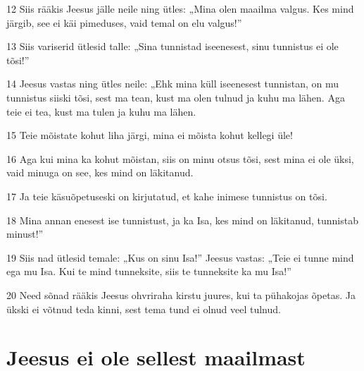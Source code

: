 \par 12 Siis rääkis Jeesus jälle neile ning ütles: „Mina olen maailma valgus. Kes mind järgib, see ei käi pimeduses, vaid temal on elu valgus!”
\par 13 Siis variserid ütlesid talle: „Sina tunnistad iseenesest, sinu tunnistus ei ole tõsi!”
\par 14 Jeesus vastas ning ütles neile: „Ehk mina küll iseenesest tunnistan, on mu tunnistus siiski tõsi, sest ma tean, kust ma olen tulnud ja kuhu ma lähen. Aga teie ei tea, kust ma tulen ja kuhu ma lähen.
\par 15 Teie mõistate kohut liha järgi, mina ei mõista kohut kellegi üle!
\par 16 Aga kui mina ka kohut mõistan, siis on minu otsus tõsi, sest mina ei ole üksi, vaid minuga on see, kes mind on läkitanud.
\par 17 Ja teie käsuõpetuseski on kirjutatud, et kahe inimese tunnistus on tõsi.
\par 18 Mina annan enesest ise tunnistust, ja ka Isa, kes mind on läkitanud, tunnistab minust!”
\par 19 Siis nad ütlesid temale: „Kus on sinu Isa!” Jeesus vastas: „Teie ei tunne mind ega mu Isa. Kui te mind tunneksite, siis te tunneksite ka mu Isa!”
\par 20 Need sõnad rääkis Jeesus ohvriraha kirstu juures, kui ta pühakojas õpetas. Ja ükski ei võtnud teda kinni, sest tema tund ei olnud veel tulnud.

\section*{Jeesus ei ole sellest maailmast}

